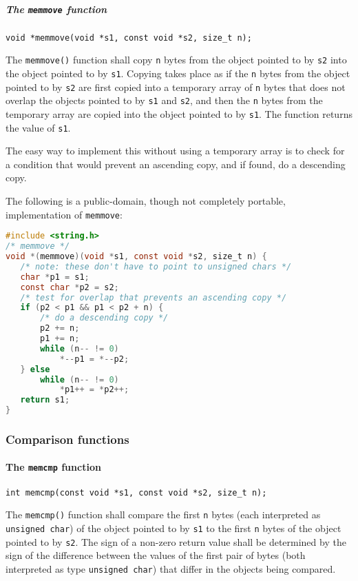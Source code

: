 \subparagraph{The \texttt{memmove} function}
\texttt{void *memmove(void *s1, const void *s2, size\_t n);}

The \texttt{memmove()} function shall copy \texttt{n} bytes from the object
pointed to by \texttt{s2} into the object pointed to by \texttt{s1}. Copying
takes place as if the \texttt{n} bytes from the object pointed to by
\texttt{s2} are first copied into a temporary array of \texttt{n} bytes that
does not overlap the objects pointed to by \texttt{s1} and \texttt{s2}, and
then the \texttt{n} bytes from the temporary array are copied into the object
pointed to by \texttt{s1}. The function returns the value of \texttt{s1}.

The easy way to implement this without using a temporary array is to check for
a condition that would prevent an ascending copy, and if found, do a descending
copy.

The following is a public-domain, though not completely portable,
implementation of \texttt{memmove}:
\lstset{basicstyle=\scriptsize, numbers=left, captionpos=b, tabsize=4}
\begin{lstlisting}[caption=Section \thesection listing \arabic{stringcnt},language={C},
breaklines=true,xleftmargin=15pt,label=lst:section\thesection listing\arabic{stringcnt}]
#include <string.h>
/* memmove */
void *(memmove)(void *s1, const void *s2, size_t n) {
   /* note: these don't have to point to unsigned chars */
   char *p1 = s1;
   const char *p2 = s2;
   /* test for overlap that prevents an ascending copy */
   if (p2 < p1 && p1 < p2 + n) {
	   /* do a descending copy */
	   p2 += n;
	   p1 += n;
	   while (n-- != 0) 
		   *--p1 = *--p2;
   } else 
	   while (n-- != 0) 
		   *p1++ = *p2++;
   return s1; 
}
\end{lstlisting}

\subsubsection{Comparison functions}

\paragraph{The \texttt{memcmp} function}
\texttt{int memcmp(const void *s1, const void *s2, size\_t n);}

The \texttt{memcmp()} function shall compare the first \texttt{n} bytes (each
interpreted as \texttt{unsigned char}) of the object pointed to by \texttt{s1}
to the first \texttt{n} bytes of the object pointed to by \texttt{s2}. The sign
of a non-zero return value shall be determined by the sign of the difference
between the values of the first pair of bytes (both interpreted as type
\texttt{unsigned char}) that differ in the objects being compared.

